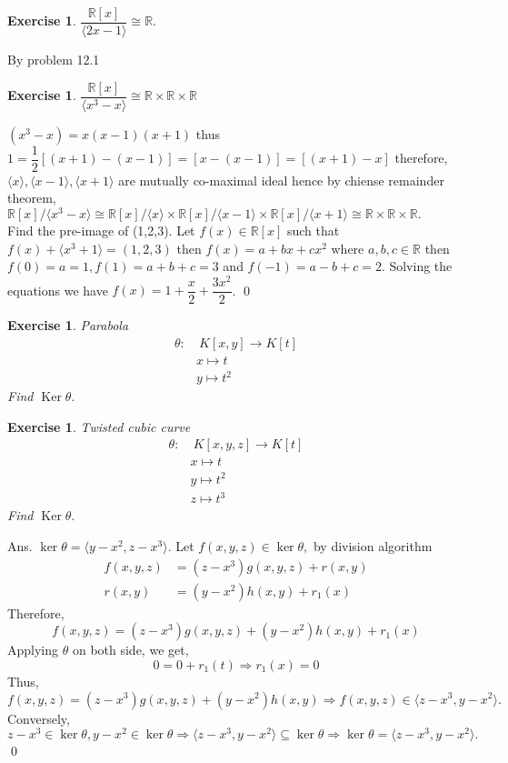\documentclass[11pt]{amsart}
\newtheorem{ex}[theorem]{Exercise}
\newcommand{\RR}{\mathbb R}
\newcommand{\gen}[1]{\langle#1\rangle}
\begin{document}
\begin{ex}
$\dfrac{{\RR}[x]}{\langle 2x-1\rangle}\cong {\RR}.$
\end{ex}
\proof By problem 12.1
\begin{ex}
$\dfrac{{\RR}[x]}{\langle x^3-x\rangle}\cong  {\RR}\times {\RR}\times {\RR}$
\end{ex}
\proof $(x^3-x)=x(x-1)(x+1)$ thus $1=\dfrac{1}{2}[(x+1)-(x-1)]=[x-(x-1)]=[(x+1)-x]$ therefore, $\gen{x},\gen{x-1},\gen{x+1}$ are mutually co-maximal ideal hence by chiense remainder theorem, ${\RR}[x]/\gen{x^3-x}\cong {\RR}[x]/\gen{x}\times {\RR}[x]/\gen{x-1}\times {\RR}[x]/\gen{x+1}\cong {\RR}\times {\RR}\times {\RR}.$ \\ Find the pre-image of (1,2,3). Let $f(x)\in {\RR}[x]$ such that $f(x)+\gen{x^3+1}=(1,2,3)$ then $f(x)=a+bx+cx^2$ where $a,b,c\in {\RR}$ then $f(0)=a=1,f(1)=a+b+c=3$ and $f(-1)=a-b+c=2$. Solving the equations we have $f(x)=1+\dfrac{x}{2}+\dfrac{3x^2}{2}$. \qed
\begin{ex} Parabola
\begin{align*}
\theta:&~K[x,y]\to K[t]\\
&x\mapsto t\\
&y\mapsto t^2
\end{align*}
Find $\operatorname{Ker}\theta.$ 
\end{ex}
\begin{ex}
Twisted cubic curve
\begin{align*}
\theta:&~K[x,y,z]\to K[t]\\
&x\mapsto t\\
&y\mapsto t^2\\
&z\mapsto t^3
\end{align*}
Find $\operatorname{Ker}\theta.$ 
\end{ex}
Ans. $\ker \theta=\gen{y-x^2,z-x^3}.$ Let $f(x,y,z)\in \ker \theta,$ by division algorithm \begin{align*}
f(x,y,z)&=(z-x^3)g(x,y,z)+r(x,y)\\
r(x,y)&=(y-x^2)h(x,y)+r_1(x)
\end{align*}
Therefore, $$f(x,y,z)=(z-x^3)g(x,y,z)+(y-x^2)h(x,y)+r_1(x)$$ Applying $\theta$ on both side, we get, $$0=0+r_1(t) \Rightarrow r_1(x)=0$$ Thus, $f(x,y,z)=(z-x^3)g(x,y,z)+(y-x^2)h(x,y) \Rightarrow f(x,y,z) \in \gen{z-x^3,y-x^2}.$ Conversely, $z-x^3 \in \ker \theta, y-x^2\in \ker \theta \Rightarrow \gen{z-x^3,y-x^2}\subseteq \ker \theta \Rightarrow \ker \theta=\gen{z-x^3,y-x^2}.$ \qed
\end{document}
